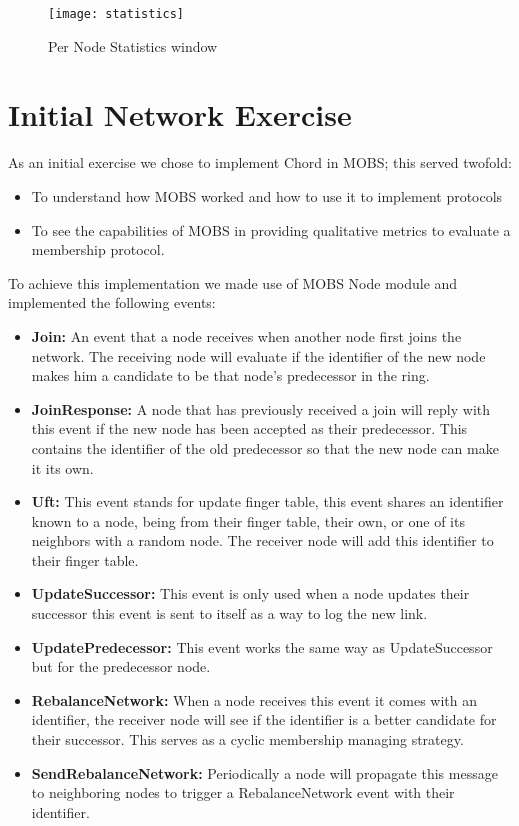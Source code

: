 \begin{figure}[h]
	\centering
	\texttt{[image: statistics]}
	\caption{Per Node Statistics window}
	\label{fig:statistics}
\end{figure}

\section{Initial Network Exercise}\label{sub:initial_exercise}

As an initial exercise we chose to implement Chord in MOBS; this served twofold:

\begin{itemize}
  \item To understand how MOBS worked and how to use it to implement protocols
  \item To see the capabilities of MOBS in providing qualitative metrics to evaluate
a membership protocol.
\end{itemize}

To achieve this implementation we made use of MOBS Node module and implemented the
following events:

\begin{itemize}
  \item \textbf{Join: } An event that a node receives when another node first joins
the network. The receiving node will evaluate if the identifier of the new node makes him
a candidate to be that node's predecessor in the ring.
  \item \textbf{JoinResponse: } A node that has previously received a join will reply
with this event if the new node has been accepted as their predecessor. This contains
the identifier of the old predecessor so that the new node can make it its own.
  \item \textbf{Uft: } This event stands for update finger table, this event shares
an identifier known to a node, being from their finger table, their own, or one of
its neighbors with a random node. The receiver node will add this identifier to their finger table.
  \item \textbf{UpdateSuccessor: } This event is only used when a node updates their successor
this event is sent to itself as a way to log the new link.
  \item \textbf{UpdatePredecessor: } This event works the same way as UpdateSuccessor
but for the predecessor node.
  \item \textbf{RebalanceNetwork: } When a node receives this event it comes with
an identifier, the receiver node will see if the identifier is a better candidate for
their successor. This serves as a cyclic membership managing strategy.
  \item \textbf{SendRebalanceNetwork: } Periodically a node will propagate this message
to neighboring nodes to trigger a RebalanceNetwork event with their identifier.
\end{itemize}

